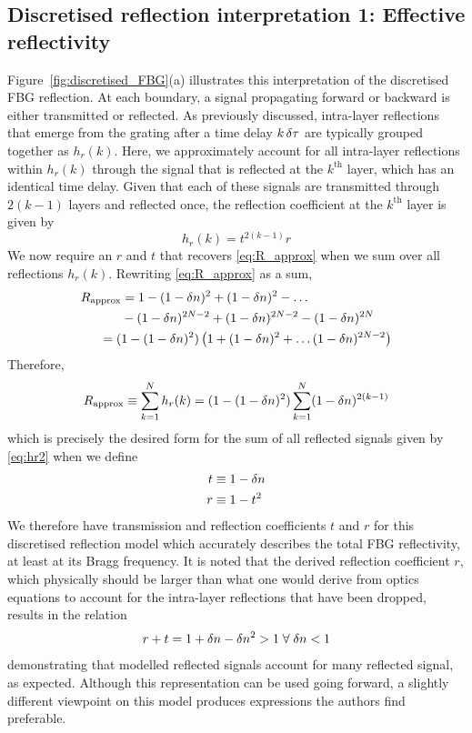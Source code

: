 \subsection{Discretised reflection interpretation 1: Effective reflectivity}
%
Figure~\ref{fig:discretised_FBG}(a) illustrates this interpretation of the discretised FBG reflection. 
At each boundary, a signal propagating forward or backward is either transmitted or reflected. 
As previously discussed, intra-layer reflections that emerge from the grating after a time delay $k \, \delta \tau$ are typically grouped together as $h_r(k)$. 
Here, we approximately account for all intra-layer reflections within $h_r(k)$ through the signal that is reflected at the $k^\text{th}$ layer, which has an identical time delay. 
Given that each of these signals are transmitted through $2(k-1)$ layers and reflected once, the reflection coefficient at the $k^{\text{th}}$ layer is given by
%
\begin{equation}
    \label{eq:hr2}
    h_r(k) = t^{2(k-1)}r
\end{equation}
%
We now require an $r$ and $t$ that recovers \eqref{eq:R_approx} when we sum over all reflections $h_r(k)$. Rewriting \eqref{eq:R_approx} as a sum,
%
\begin{align*}
    R_\text{approx} &= 1 - (1-\dn)^2 + (1-\dn)^2 - \dots \\
                    &- (1-\dn)^{2N-2} + (1-\dn)^{2N-2} - (1-\dn)^{2N}\\
                    \vspace{0.5em}
                    = (&1-(1-\dn)^2) \left( 1 + (1-\dn)^2 + \dots (1-\dn)^{2N-2} \right)
\end{align*}
%
Therefore,
%
\begin{equation*}
    R_\text{approx} \equiv \sum_{k=1}^{N} h_r(k) = (1-(1-\delta n)^2)\sum_{k=1}^{N} (1-\delta n)^{2(k-1)}
\end{equation*}
%
%
which is precisely the desired form for the sum of all reflected signals given by \eqref{eq:hr2} when we define
%
\begin{align*}
    t &\equiv 1-\delta n
    \\
    r &\equiv 1-t^2
\end{align*}
%
We therefore have transmission and reflection coefficients $t$ and $r$ for this discretised reflection model which accurately describes the total FBG reflectivity, at least at its Bragg frequency. 
It is noted that the derived reflection coefficient $r$, which physically should be larger than what one would derive from optics equations to account for the intra-layer reflections that have been dropped, results in the relation
%
\begin{equation*}
    r + t = 1 + \delta n - \delta n^2 > 1 \; \forall \; \delta n<1
\end{equation*}
%
demonstrating that modelled reflected signals account for many reflected signal, as expected. 
Although this representation can be used going forward, a slightly different viewpoint on this model produces expressions the authors find preferable.
%
\par
%
